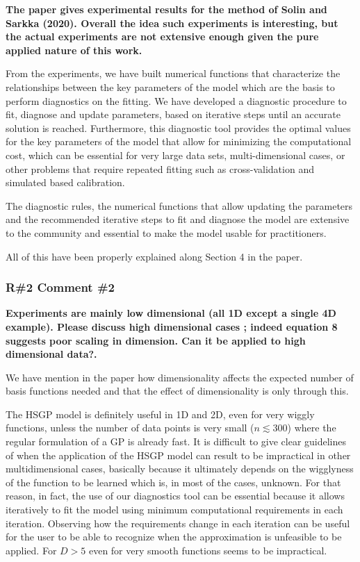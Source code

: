 \documentclass[11pt]{report}
\begin{document}
\textbf{The paper gives experimental results for the method of Solin and Sarkka  (2020). Overall the idea such experiments is interesting, but the actual experiments are not extensive enough given the pure applied nature of this work.}

From the experiments, we have built numerical functions that characterize the relationships between the key parameters of the model which are the basis to perform diagnostics on the fitting. We have developed a diagnostic procedure to fit, diagnose and update parameters, based on iterative steps until an accurate solution is reached. Furthermore, this diagnostic tool provides the optimal values for the key parameters of the model that allow for minimizing the computational cost, which can be essential for very large data sets, multi-dimensional cases, or other problems that require repeated fitting such as cross-validation and simulated based calibration.

The diagnostic rules, the numerical functions that allow updating the parameters and the recommended iterative steps to fit and diagnose the model are extensive to the community and essential to make the model usable for practitioners.

All of this have been properly explained along Section 4 in the paper.

\subsubsection*{R\#2 Comment \#2}

\textbf{Experiments are mainly low dimensional (all 1D except a single 4D example). Please discuss high dimensional cases ; indeed equation 8 suggests poor scaling in dimension. Can it be applied to high dimensional data?.} 

We have mention in the paper how dimensionality affects the expected number of basis functions needed and that the effect of dimensionality is only through this. 

The HSGP model is definitely useful in 1D and 2D, even for very wiggly functions, unless the number of data points is very small ($n \lesssim 300$) where the regular formulation of a GP is already fast. It is difficult to give clear guidelines of when the application of the HSGP model can result to be impractical in other multidimensional cases, basically because it ultimately depends on the wigglyness of the function to be learned which is, in most of the cases, unknown. For that reason, in fact, the use of our diagnostics tool can be essential because it allows iteratively to fit the model using minimum computational requirements in each iteration. Observing how the requirements change in each iteration can be useful for the user to be able to recognize when the approximation is unfeasible to be applied. For $D>5$ even for very smooth functions seems to be impractical.
\end{document}

